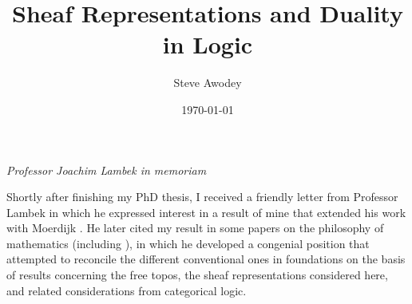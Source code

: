 \documentclass[12pt]{article}
\theoremstyle{remark}
\theoremstyle{definition}
\begin{document}

\title{
Sheaf Representations and Duality in Logic
}
\author{
Steve Awodey
}
\date{
\today}

\maketitle



%
%
%
%
%
%
%
%
%
%
%
%

%


%

\centerline{\emph{Professor Joachim Lambek in memoriam}}
\bigskip 
\bigskip


\noindent Shortly after finishing my PhD thesis, I received a friendly letter from Professor Lambek in which he expressed interest in a result of mine that extended his work with Moerdijk \cite{LM}. He later cited my result in some papers on the philosophy of mathematics (including \cite{L1,L2}), in which he developed a congenial  position that attempted to reconcile the different conventional ones in foundations on the basis of results concerning the free topos, the sheaf representations considered here, and related considerations from categorical logic.    
\end{document}
